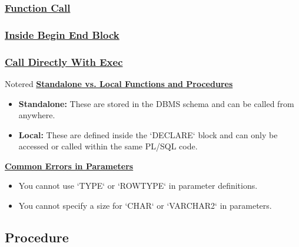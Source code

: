 

\subsubsection*{\underline{Function Call}}

\subsubsection*{\underline{Inside Begin End Block}}



\subsubsection*{\underline{Call Directly With Exec}}



\vspace{0.25cm}

\begin{prettyBox}{Note}{red}
\textbf{\underline{Standalone vs. Local Functions and Procedures}}
\begin{itemize}
    \item \textbf{Standalone:} These are stored in the DBMS schema and can be called from anywhere.
    \item \textbf{Local:} These are defined inside the `DECLARE` block and can only be accessed or called within the same PL/SQL code.
\end{itemize}

\vspace{0.25cm}

\textbf{\underline{Common Errors in Parameters}}

\begin{itemize}
    \item You cannot use `TYPE` or `ROWTYPE` in parameter definitions.
    \item You cannot specify a size for `CHAR` or `VARCHAR2` in parameters.
\end{itemize}
\end{prettyBox}



\vspace{0.5cm}
\subsection{Procedure}

